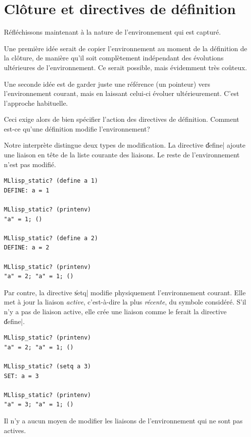 \documentclass{../../LaTeX/tdsimple}
\begin{document}
\section{Clôture et directives de définition}

Réfléchissons maintenant à la nature de l'environnement qui est
capturé.

Une première idée serait de copier l'environnement au moment de la
définition de la clôture, de manière qu'il soit complètement
indépendant des évolutions ultérieures de l'environnement. Ce serait
possible, mais évidemment très coûteux.

Une seconde idée est de garder juste une référence (un pointeur) vers
l'environnement courant, mais en laissant celui-ci évoluer
ultérieurement. C'est l'approche habituelle.

Ceci exige alors de bien spécifier l'action des directives de
définition. Comment est-ce qu'une définition modifie l'environnement?

Notre interprète distingue deux types de modification. La directive
\|define| ajoute une liaison en tête de la liste courante des
liaisons. Le reste de l'environnement n'est pas modifié.
\begin{lstlisting}
MLlisp_static? (define a 1)
DEFINE: a = 1

MLlisp_static? (printenv)
"a" = 1; ()

MLlisp_static? (define a 2)
DEFINE: a = 2

MLlisp_static? (printenv)
"a" = 2; "a" = 1; ()
\end{lstlisting}

Par contre, la directive \|setq| modifie physiquement l'environnement
courant. Elle met à jour la liaison \emph{active}, c'est-à-dire la
plus \emph{récente}, du symbole considéré. S'il n'y a pas de liaison active,
elle crée une liaison comme le ferait la directive \|define|.
\begin{lstlisting}
MLlisp_static? (printenv)
"a" = 2; "a" = 1; ()

MLlisp_static? (setq a 3)
SET: a = 3

MLlisp_static? (printenv)
"a" = 3; "a" = 1; ()
\end{lstlisting}
\begin{attention}
  Il n'y a aucun moyen de modifier les liaisons de l'environnement qui
  ne sont pas actives.
\end{attention}
\end{document}
